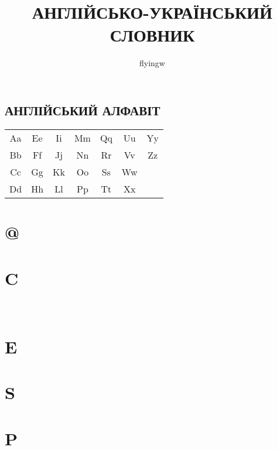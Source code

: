 


\title{\uppercase{Англійсько-український\\словник}}
\author{flyingw}
\maketitle

\thispagestyle{empty}
\clearpage

\begin{center}
\section{\uppercase{Англійський алфавіт}}
\begin{tabular}{| c c c c c c c |}
  \hline
  Aa & Ee & Ii & Mm & Qq & Uu & Yy \\
  Bb & Ff & Jj & Nn & Rr & Vv & Zz \\
  Cc & Gg & Kk & Oo & Ss & Ww &    \\
  Dd & Hh & Ll & Pp & Tt & Xx &    \\
  \hline
\end{tabular}
\end{center}

\thispagestyle{empty}
\clearpage

\begin{twocolumn}

\section{@}

\section{C}
\\

\section{E}

\section{S}

\section{P}

\end{twocolumn}

